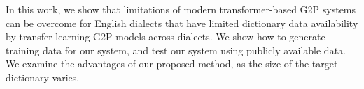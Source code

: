 In this work, we show that limitations of modern transformer-based G2P systems can be overcome for English dialects that have limited dictionary data availability by transfer learning G2P models across dialects. We show how to generate training data for our system, and test our system using publicly available data. We examine the advantages of our proposed method, as the size of the target dictionary varies.




